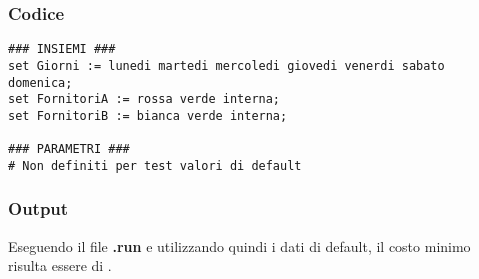 \subsubsection{Codice}
\begin{lstlisting}
### INSIEMI ###
set Giorni := lunedi martedi mercoledi giovedi venerdi sabato domenica;
set FornitoriA := rossa verde interna;
set FornitoriB := bianca verde interna;

### PARAMETRI ###
# Non definiti per test valori di default
\end{lstlisting}
\subsubsection{Output}
Eseguendo il file \textbf{.run} e utilizzando quindi i dati di default, il costo minimo risulta essere di .